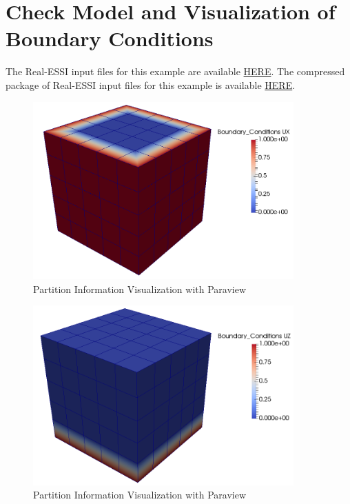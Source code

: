 \clearpage
\newpage
\section{Check Model and Visualization of Boundary Conditions}
\label{Check_Model_and_Visualization_of_Boundary_Conditions}

The Real-ESSI input files for this example are available 
\href{https://github.com/yuan-energy/Real-ESSI-Short-Course-Examples/tree/master/short-course-examples/Day1/Check_Model_and_Visualization_of_Boundary_Conditions}{HERE}. 
The compressed package of Real-ESSI input files for this example is available 
\href{https://github.com/yuan-energy/Real-ESSI-Short-Course-Examples/blob/master/short-course-examples/Day1/Check_Model_and_Visualization_of_Boundary_Conditions/Check_Model_and_Visualization_of_Boundary_Conditions.tgz?raw=true}{HERE}. 

\begin{figure}[H]
  \centering
  \includegraphics[width = 10cm]{./Figure-files/Day1/Check_Model_and_Visualization_of_Boundary_Conditions/boundary_ux.png}
  \caption{Partition Information Visualization with Paraview}
  \label{fig_check_model_and_boundary_condition_ux}
\end{figure}



\begin{figure}[H]
  \centering
  \includegraphics[width = 10cm]{./Figure-files/Day1/Check_Model_and_Visualization_of_Boundary_Conditions/boundary_uz.png}
  \caption{Partition Information Visualization with Paraview}
  \label{fig_check_model_and_boundary_condition_uz}
\end{figure}





